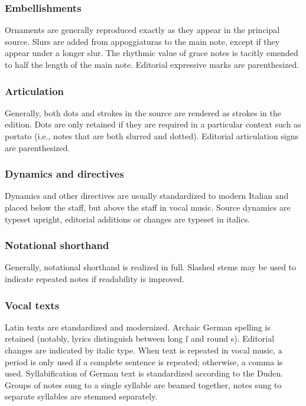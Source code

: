 \documentclass{ees}
\begin{document}
\subsubsection{Embellishments}

Ornaments are generally reproduced exactly as they appear in the principal source. Slurs are added from appoggiaturas to the main note, except if they appear under a longer slur. The rhythmic value of grace notes is tacitly emended to half the length of the main note. Editorial expressive marks are parenthesized.


\subsubsection{Articulation}

Generally, both dots and strokes in the source are rendered as strokes in the edition. Dots are only retained if they are required in a particular context such as portato (i.e., notes that are both slurred and dotted). Editorial articulation signs are parenthesized.


\subsubsection{Dynamics and directives}

Dynamics and other directives are usually standardized to modern Italian and placed below the staff, but above the staff in vocal music. Source dynamics are typeset upright, editorial additions or changes are typeset in italics.


\subsubsection{Notational shorthand}

Generally, notational shorthand is realized in full. Slashed stems may be used to indicate repeated notes if readability is improved.


\subsubsection{Vocal texts}

Latin texts are standardized and modernized. Archaic German spelling is retained (notably, lyrics distinguish between long ſ and round s). Editorial changes are indicated by italic type. When text is repeated in vocal music, a period is only used if a complete sentence is repeated; otherwise, a comma is used. Syllabification of German text is standardized according to the Duden. Groups of notes sung to a single syllable are beamed together, notes sung to separate syllables are stemmed separately.
\end{document}
